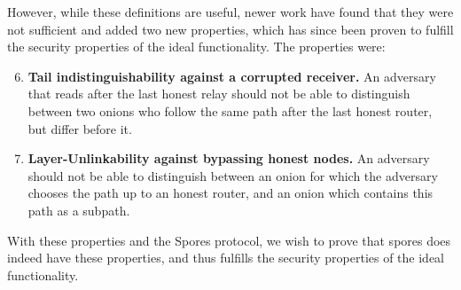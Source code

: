 However, while these definitions are useful, newer work have found
that they were not sufficient and added two new properties, which has
since been proven to fulfill the security properties of the ideal
functionality\cite{kuhn}. The properties were:

\begin{enumerate}
  \setcounter{enumi}{5}
  \item{{\bf Tail indistinguishability against a corrupted receiver.}
    An adversary that reads after the last honest relay should not be
    able to distinguish between two onions who follow the same path
    after the last honest router, but differ before it.}

  \item{{\bf Layer-Unlinkability against bypassing honest nodes.} An
    adversary should not be able to distinguish between an onion for
    which the adversary chooses the path up to an honest router, and
    an onion which contains this path as a subpath.}
\end{enumerate}

With these properties and the Spores protocol, we wish to prove that
spores does indeed have these properties, and thus fulfills the
security properties of the ideal functionality. 
